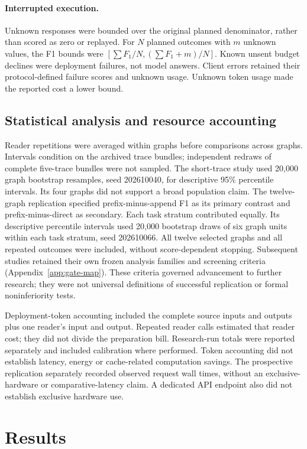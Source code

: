 \paragraph{Interrupted execution.} Unknown responses were bounded over the original planned denominator, rather than scored as zero or replayed. For $N$ planned outcomes with $m$ unknown values, the F1 bounds were $[\sum F_1/N,(\sum F_1+m)/N]$. Known unsent budget declines were deployment failures, not model answers. Client errors retained their protocol-defined failure scores and unknown usage. Unknown token usage made the reported cost a lower bound.

\subsection{Statistical analysis and resource accounting}
Reader repetitions were averaged within graphs before comparisons across graphs. Intervals condition on the archived trace bundles; independent redraws of complete five-trace bundles were not sampled. The short-trace study used 20,000 graph bootstrap resamples, seed 202610040, for descriptive 95\% percentile intervals. Its four graphs did not support a broad population claim. The twelve-graph replication specified prefix-minus-append F1 as its primary contrast and prefix-minus-direct as secondary. Each task stratum contributed equally. Its descriptive percentile intervals used 20,000 bootstrap draws of six graph units within each task stratum, seed 202610066. All twelve selected graphs and all repeated outcomes were included, without score-dependent stopping. Subsequent studies retained their own frozen analysis families and screening criteria (Appendix~\ref{app:gate-map}). These criteria governed advancement to further research; they were not universal definitions of successful replication or formal noninferiority tests.

Deployment-token accounting included the complete source inputs and outputs plus one reader's input and output. Repeated reader calls estimated that reader cost; they did not divide the preparation bill. Research-run totals were reported separately and included calibration where performed. Token accounting did not establish latency, energy or cache-related computation savings. The prospective replication separately recorded observed request wall times, without an exclusive-hardware or comparative-latency claim. A dedicated API endpoint also did not establish exclusive hardware use.

\section{Results}
